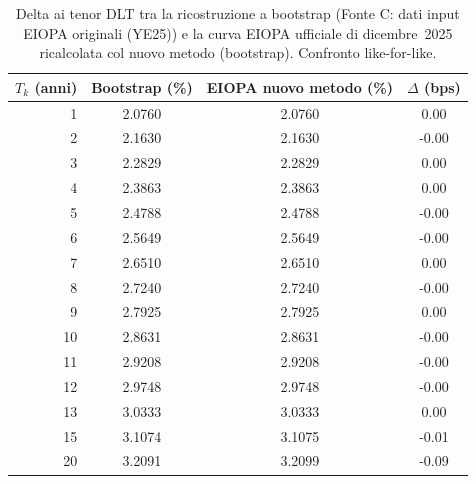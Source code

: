 \begin{table}[H]\centering\small
\caption{Delta ai tenor DLT tra la ricostruzione a bootstrap (Fonte C: dati input EIOPA originali (YE25)) e la curva EIOPA ufficiale di dicembre~2025 ricalcolata col nuovo metodo (bootstrap). Confronto like-for-like.}
\label{tab:delta-new-input}\renewcommand{\arraystretch}{1.15}
\begin{tabular}{rccc}
\toprule
$T_k$ (anni) & Bootstrap (\%) & EIOPA nuovo metodo (\%) & $\Delta$ (bps)\\
\midrule
\rowcolor{rowtint}1 & 2.0760 & 2.0760 & 0.00\\
2 & 2.1630 & 2.1630 & -0.00\\
\rowcolor{rowtint}3 & 2.2829 & 2.2829 & 0.00\\
4 & 2.3863 & 2.3863 & 0.00\\
\rowcolor{rowtint}5 & 2.4788 & 2.4788 & -0.00\\
6 & 2.5649 & 2.5649 & -0.00\\
\rowcolor{rowtint}7 & 2.6510 & 2.6510 & 0.00\\
8 & 2.7240 & 2.7240 & -0.00\\
\rowcolor{rowtint}9 & 2.7925 & 2.7925 & 0.00\\
10 & 2.8631 & 2.8631 & -0.00\\
\rowcolor{rowtint}11 & 2.9208 & 2.9208 & -0.00\\
12 & 2.9748 & 2.9748 & -0.00\\
\rowcolor{rowtint}13 & 3.0333 & 3.0333 & 0.00\\
15 & 3.1074 & 3.1075 & -0.01\\
\rowcolor{rowtint}20 & 3.2091 & 3.2099 & -0.09\\
\bottomrule
\end{tabular}
\end{table}
